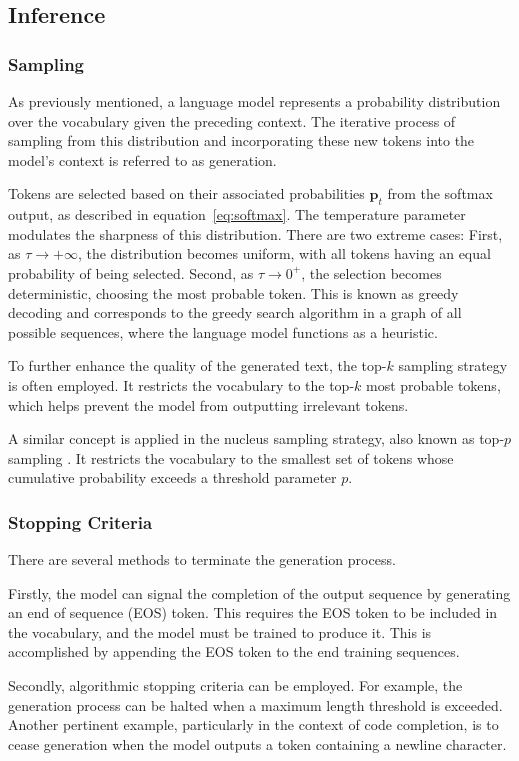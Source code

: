 \subsection{Inference}


\subsubsection*{Sampling}\label{sec:sampling}

As previously mentioned, a language model represents a probability distribution over the vocabulary given the preceding context. The iterative process of sampling from this distribution and incorporating these new tokens into the model's context is referred to as generation.

Tokens are selected based on their associated probabilities \(\mathbf{p}_t\) from the softmax output, as described in equation~\ref{eq:softmax}. The temperature parameter modulates the sharpness of this distribution. There are two extreme cases: First, as \(\tau \to +\infty\), the distribution becomes uniform, with all tokens having an equal probability of being selected. Second, as \(\tau \to 0^+\), the selection becomes deterministic, choosing the most probable token. This is known as greedy decoding and corresponds to the greedy search algorithm in a graph of all possible sequences, where the language model functions as a heuristic.

To further enhance the quality of the generated text, the top-\(k\) sampling strategy is often employed. It restricts the vocabulary to the top-\(k\) most probable tokens, which helps prevent the model from outputting irrelevant tokens.

A similar concept is applied in the nucleus sampling strategy, also known as top-\(p\) sampling \parencite{holtzman2019}. It restricts the vocabulary to the smallest set of tokens whose cumulative probability exceeds a threshold parameter \(p\).

\subsubsection*{Stopping Criteria}

There are several methods to terminate the generation process.

Firstly, the model can signal the completion of the output sequence by generating an end of sequence (EOS) token. This requires the EOS token to be included in the vocabulary, and the model must be trained to produce it. This is accomplished by appending the EOS token to the end training sequences.

Secondly, algorithmic stopping criteria can be employed. For example, the generation process can be halted when a maximum length threshold is exceeded. Another pertinent example, particularly in the context of code completion, is to cease generation when the model outputs a token containing a newline character.


